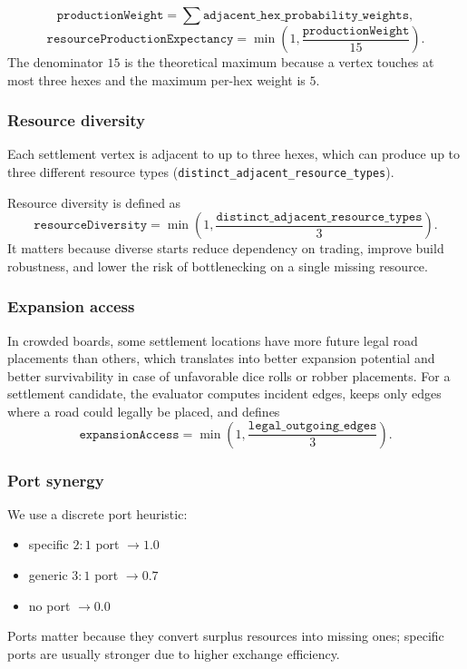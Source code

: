 \documentclass{article}
\begin{document}
\[
\texttt{productionWeight} = \sum \texttt{adjacent\_hex\_probability\_weights},
\]
\[
\texttt{resourceProductionExpectancy} = \min\left(1, \frac{\texttt{productionWeight}}{15}\right).
\]
The denominator $15$ is the theoretical maximum because a vertex touches at most three hexes and the maximum per-hex weight is $5$.

\subsubsection{Resource diversity}
\label{app:resource-diversity}

Each settlement vertex is adjacent to up to three hexes, which can produce up to three different resource types (\texttt{distinct\_adjacent\_resource\_types}).

Resource diversity is defined as
\[
\texttt{resourceDiversity} = \min\left(1, \frac{\texttt{distinct\_adjacent\_resource\_types}}{3}\right).
\]
It matters because diverse starts reduce dependency on trading, improve build robustness, and lower the risk of bottlenecking on a single missing resource.

\subsubsection{Expansion access}
\label{app:expansion-access}
In crowded boards, some settlement locations have more future legal road placements than others, which translates into better expansion potential and better survivability in case of unfavorable dice rolls or robber placements.
For a settlement candidate, the evaluator computes incident edges, keeps only edges where a road could legally be placed, and defines
\[
\texttt{expansionAccess} = \min\left(1, \frac{\texttt{legal\_outgoing\_edges}}{3}\right).
\]

\subsubsection{Port synergy}
\label{app:port-synergy}
We use a discrete port heuristic:
\begin{itemize}
    \item specific $2{:}1$ port $\rightarrow 1.0$
    \item generic $3{:}1$ port $\rightarrow 0.7$
    \item no port $\rightarrow 0.0$
\end{itemize}
Ports matter because they convert surplus resources into missing ones; specific ports are usually stronger due to higher exchange efficiency.
\end{document}
